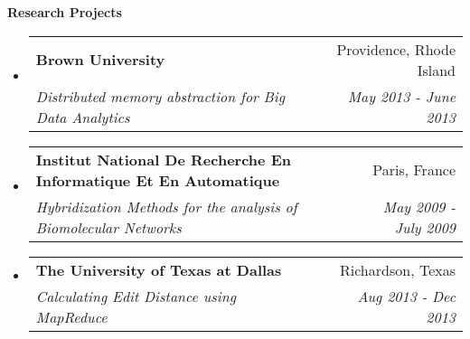 \documentclass[letterpaper,11pt]{article}
\makeatletter
\newcommand{\resitem}[1]{\item[\ding{226}] #1 \vspace{-2pt}}
\newcommand{\resheading}[1]{{\large \colorbox{mygrey}{\begin{minipage}{\textwidth}{\textbf{#1 \vphantom{p\^{E}}}}\end{minipage}}}}
\newcommand{\ressubheading}[4]{
\begin{tabular*}{7.0in}{l@{\extracolsep{\fill}}r}
		\textbf{#1} & #2 \\
		\textit{#3} & \textit{#4} \\
\end{tabular*}\vspace{-6pt}}
\makeatother
\begin{document}
\resheading{Research Projects}
\begin{itemize}

\item
	\ressubheading{Brown University}{Providence, Rhode Island}{Distributed memory abstraction for Big Data Analytics}{May 2013 - June 2013}


\item
	\ressubheading{Institut National De Recherche En Informatique Et En Automatique}{Paris, France}{Hybridization Methods for the analysis of Biomolecular Networks}{May 2009 - July 2009}
%

\item
	\ressubheading{The University of Texas at Dallas}{Richardson, Texas}{Calculating Edit Distance using MapReduce}{\textit{Aug 2013 - Dec 2013}}

\end{itemize}
\end{document}
